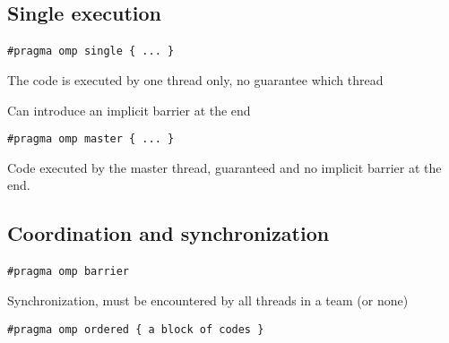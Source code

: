 \documentclass[%
oneside,                 %
final,                   %
10pt]{article}
\begin{document}
\subsection*{Single execution}

\paragraph{}


\begin{verbatim}
#pragma omp single { ... }

\end{verbatim}

The code is executed by one thread only, no guarantee which thread

Can introduce an implicit barrier at the end


\begin{verbatim}
#pragma omp master { ... }

\end{verbatim}

Code executed by the master thread, guaranteed and no implicit barrier at the end.



\subsection*{Coordination and synchronization}

\paragraph{}


\begin{verbatim}
#pragma omp barrier

\end{verbatim}

Synchronization, must be encountered by all threads in a team (or none)


\begin{verbatim}
#pragma omp ordered { a block of codes }

\end{verbatim}
\end{document}
